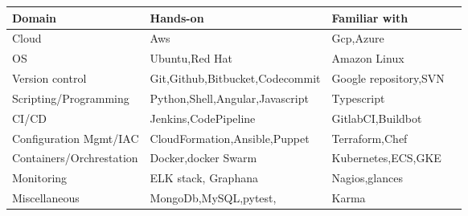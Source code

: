 \documentclass[9pt]{developercv} %
\begin{document}
\begin{tabular}{ |p{5cm}|p{6cm}|p{5cm}|p{3cm}|  }
 
 \hline
 \hspace{0.1cm}\textbf{Domain}& \hspace{0.1cm}\textbf{Hands-on}&\hspace{0.1cm}\textbf{Familiar with}\\
 \hline
\hspace{0.1cm} Cloud   & \hspace{0.1cm}Aws    &\hspace{0.1cm}Gcp,Azure\\
 \hline
 \hspace{0.1cm} OS&  \hspace{0.1cm}Ubuntu,Red Hat & \hspace{0.1cm}Amazon Linux  \\
 \hline
\hspace{0.1cm} Version control&  \hspace{0.1cm}Git,Github,Bitbucket,Codecommit & \hspace{0.1cm}Google repository,SVN  \\
 \hline
\hspace{0.1cm} Scripting/Programming &\hspace{0.1cm}Python,Shell,Angular,Javascript & \hspace{0.1cm}Typescript\\
 \hline
\hspace{0.1cm} CI/CD    &\hspace{0.1cm}Jenkins,CodePipeline & \hspace{0.1cm}GitlabCI,Buildbot\\
 \hline
\hspace{0.1cm} Configuration Mgmt/IAC &   \hspace{0.1cm}CloudFormation,Ansible,Puppet  & \hspace{0.1cm}Terraform,Chef\\
\hline
\hspace{0.1cm} Containers/Orchrestation& \hspace{0.1cm}Docker,docker Swarm  & \hspace{0.1cm}Kubernetes,ECS,GKE   \\
 \hline
 
 \hspace{0.1cm} Monitoring& \hspace{0.1cm}ELK stack, Graphana  & \hspace{0.1cm}Nagios,glances\\
 \hline
 \hspace{0.1cm} Miscellaneous& \hspace{0.1cm}MongoDb,MySQL,pytest,  & \hspace{0.1cm}Karma\\
 \hline
\end{tabular}
\end{document}
